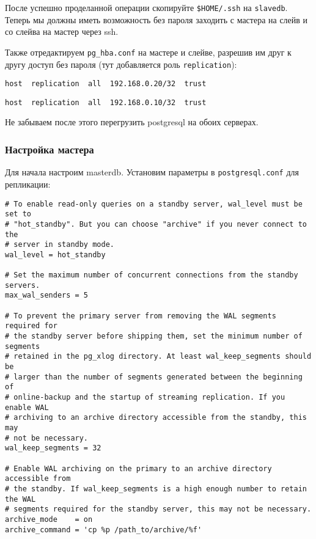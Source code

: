После успешно проделанной операции скопируйте \lstinline!$HOME/.ssh! на \lstinline!slavedb!. Теперь мы должны иметь возможность без пароля заходить с мастера на слейв и со слейва на мастер через ssh.

Также отредактируем \lstinline!pg_hba.conf! на мастере и слейве, разрешив им друг к другу доступ без пароля (тут добавляется роль \lstinline!replication!):

\begin{lstlisting}[label=lst:streaming7,caption=Мастер pg\_hba.conf]
host  replication  all  192.168.0.20/32  trust
\end{lstlisting}

\begin{lstlisting}[label=lst:streaming8,caption=Слейв pg\_hba.conf]
host  replication  all  192.168.0.10/32  trust
\end{lstlisting}

Не забываем после этого перегрузить postgresql на обоих серверах.

\subsubsection{Настройка мастера}

Для начала настроим masterdb. Установим параметры в \lstinline!postgresql.conf! для репликации:

\begin{lstlisting}[label=lst:streaming9,caption=Настройка мастера]
# To enable read-only queries on a standby server, wal_level must be set to
# "hot_standby". But you can choose "archive" if you never connect to the
# server in standby mode.
wal_level = hot_standby

# Set the maximum number of concurrent connections from the standby servers.
max_wal_senders = 5

# To prevent the primary server from removing the WAL segments required for
# the standby server before shipping them, set the minimum number of segments
# retained in the pg_xlog directory. At least wal_keep_segments should be
# larger than the number of segments generated between the beginning of
# online-backup and the startup of streaming replication. If you enable WAL
# archiving to an archive directory accessible from the standby, this may
# not be necessary.
wal_keep_segments = 32

# Enable WAL archiving on the primary to an archive directory accessible from
# the standby. If wal_keep_segments is a high enough number to retain the WAL
# segments required for the standby server, this may not be necessary.
archive_mode    = on
archive_command = 'cp %p /path_to/archive/%f'
\end{lstlisting}

